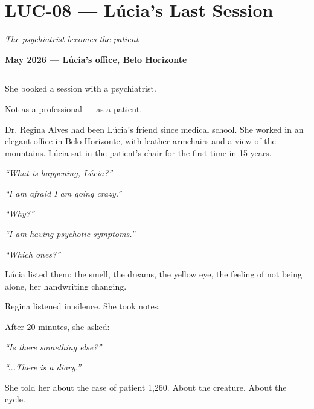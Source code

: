 \section*{\textbf{LUC-08} --- Lúcia's Last Session}

\noindent \textit{The psychiatrist becomes the patient}

\noindent \textbf{May 2026 --- Lúcia's office, Belo Horizonte}

\vspace{0.5em}\noindent\rule{\textwidth}{0.5pt}\vspace{0.5em}

\noindent She booked a session with a psychiatrist.

\noindent Not as a professional --- as a patient.

\noindent Dr. Regina Alves had been Lúcia's friend since medical school. She worked in an elegant office in Belo Horizonte, with leather armchairs and a view of the mountains. Lúcia sat in the patient's chair for the first time in 15 years.

\noindent \textit{\textquotedblleft{}What is happening, Lúcia?\textquotedblright{}}

\noindent \textit{\textquotedblleft{}I am afraid I am going crazy.\textquotedblright{}}

\noindent \textit{\textquotedblleft{}Why?\textquotedblright{}}

\noindent \textit{\textquotedblleft{}I am having psychotic symptoms.\textquotedblright{}}

\noindent \textit{\textquotedblleft{}Which ones?\textquotedblright{}}

\noindent Lúcia listed them: the smell, the dreams, the yellow eye, the feeling of not being alone, her handwriting changing.

\noindent Regina listened in silence. She took notes.

\noindent After 20 minutes, she asked:

\noindent \textit{\textquotedblleft{}Is there something else?\textquotedblright{}}

\noindent \textit{\textquotedblleft{}...There is a diary.\textquotedblright{}}

\noindent She told her about the case of patient 1,260. About the creature. About the cycle.

